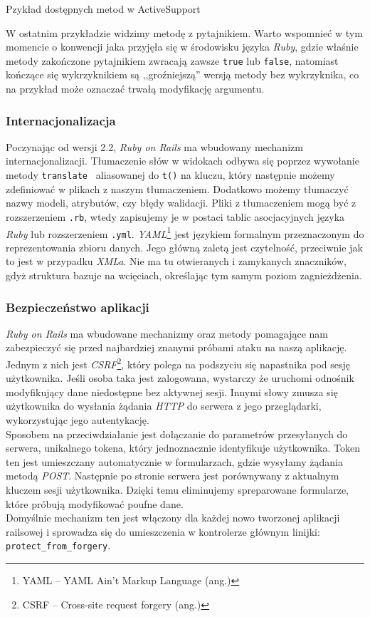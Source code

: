 \documentclass[a4paper,12pt]{article}
\begin{document}
\begin{listing}
  
  \caption{Pzykład dostępnych metod w ActiveSupport}
  \label{listing:activesupport}
\end{listing}


W ostatnim przykładzie widzimy metodę z pytajnikiem. Warto wspomnieć w tym
momencie o konwencji jaka przyjęła się w środowisku języka \emph{Ruby}, gdzie
właśnie metody zakończone pytajnikiem zwracają zawsze \texttt{true} lub
\texttt{false}, natomiast kończące się wykrzyknikiem są ,,groźniejszą'' wersją metody
bez wykrzyknika, co na przykład może oznaczać trwałą modyfikację argumentu.

\subsubsection{Internacjonalizacja}
Poczynając od wersji 2.2, \emph{Ruby on Rails} ma wbudowany mechanizm internacjonalizacji.
Tłumaczenie słów w widokach odbywa się poprzez wywołanie metody \texttt{translate
} aliasowanej do \texttt{t()} na kluczu, który następnie możemy zdefiniować w plikach z
naszym tłumaczeniem. Dodatkowo możemy tłumaczyć nazwy modeli, atrybutów, czy błędy
walidacji. Pliki z tłumaczeniem mogą być z rozszerzeniem \texttt{.rb}, wtedy zapisujemy je
w postaci tablic asocjacyjnych języka \emph{Ruby} lub rozszerzeniem \texttt{.yml}.
\emph{YAML}\footnote{YAML -- YAML Ain't Markup Language (ang.)} jest językiem formalnym
przeznaczonym do reprezentowania zbioru danych. Jego główną zaletą jest czytelność,
przeciwnie jak to jest w przypadku \emph{XMLa}. Nie ma tu otwieranych i zamykanych
znaczników, gdyż struktura bazuje na wcięciach, określając tym samym poziom zagnieżdżenia.


\subsubsection{Bezpieczeństwo aplikacji}
\emph{Ruby on Rails} ma wbudowane mechanizmy oraz metody pomagające nam zabezpieczyć się
przed najbardziej znanymi próbami ataku na naszą aplikację. Jednym z nich jest
\emph{CSRF}\footnote{CSRF -- Cross-site request forgery (ang.)}, który polega na podszyciu się
napastnika pod sesję użytkownika. Jeśli osoba taka jest zalogowana, wystarczy że uruchomi
odnośnik modyfikujący dane niedostępne bez aktywnej sesji. Innymi słowy zmusza się
użytkownika do wysłania żądania \emph{HTTP} do serwera z jego przeglądarki, wykorzystując
jego autentykację.\\
Sposobem na przeciwdziałanie jest dołączanie do parametrów przesyłanych do serwera,
unikalnego tokena, który jednoznacznie identyfikuje użytkownika. Token ten jest umieszczany
automatycznie w formularzach, gdzie wysyłamy żądania metodą \emph{POST}. Następnie po
stronie serwera jest porównywany z aktualnym kluczem sesji użytkownika. Dzięki temu
eliminujemy spreparowane formularze, które próbują modyfikować poufne dane.\\
Domyślnie mechanizm ten jest włączony dla każdej nowo tworzonej aplikacji railsowej i
sprowadza się do umieszczenia w kontrolerze głównym linijki: \texttt{protect\_from\_forgery}.
\end{document}
